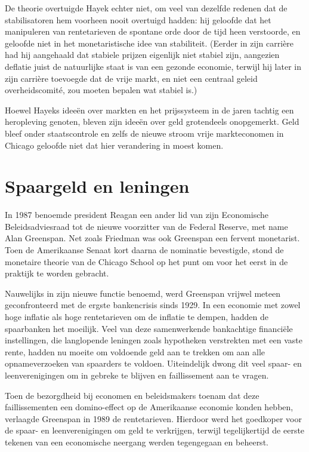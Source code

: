 \documentclass[smalldemyvopaper,11pt,twoside,onecolumn,openright,extrafontsizes,hidelinks]{memoir}
\begin{document}
De theorie overtuigde Hayek echter niet, om veel van dezelfde redenen
dat de stabilisatoren hem voorheen nooit overtuigd hadden: hij geloofde
dat het manipuleren van rentetarieven de spontane orde door de tijd heen
verstoorde, en geloofde niet in het monetaristische idee van
stabiliteit. (Eerder in zijn carrière had hij aangehaald dat stabiele
prijzen eigenlijk niet stabiel zijn, aangezien deflatie juist de
natuurlijke staat is van een gezonde economie, terwijl hij later in zijn
carrière toevoegde dat de vrije markt, en niet een centraal geleid
overheidscomité, zou moeten bepalen wat stabiel is.)

Hoewel Hayeks ideeën over markten en het prijssysteem in de jaren
tachtig een heropleving genoten, bleven zijn ideeën over geld
grotendeels onopgemerkt. Geld bleef onder staatscontrole en zelfs de
nieuwe stroom vrije markteconomen in Chicago geloofde niet dat hier
verandering in moest komen.

\section{Spaargeld en leningen}\label{spaargeld-en-leningen}

In 1987 benoemde president Reagan een ander lid van zijn Economische
Beleidsadviesraad tot de nieuwe voorzitter van de Federal Reserve, met
name Alan Greenspan. Net zoals Friedman was ook Greenspan een fervent
monetarist. Toen de Amerikaanse Senaat kort daarna de nominatie
bevestigde, stond de monetaire theorie van de Chicago School op het punt
om voor het eerst in de praktijk te worden gebracht.

Nauwelijks in zijn nieuwe functie benoemd, werd Greenspan vrijwel meteen
geconfronteerd met de ergste bankencrisis sinds 1929. In een economie
met zowel hoge inflatie als hoge rentetarieven om de inflatie te dempen,
hadden de spaarbanken het moeilijk. Veel van deze samenwerkende
bankachtige financiële instellingen, die langlopende leningen zoals
hypotheken verstrekten met een vaste rente, hadden nu moeite om
voldoende geld aan te trekken om aan alle opnameverzoeken van spaarders
te voldoen. Uiteindelijk dwong dit veel spaar- en leenverenigingen om in
gebreke te blijven en faillissement aan te vragen.

Toen de bezorgdheid bij economen en beleidsmakers toenam dat deze
faillissementen een domino-effect op de Amerikaanse economie konden
hebben, verlaagde Greenspan in 1989 de rentetarieven. Hierdoor werd het
goedkoper voor de spaar- en leenverenigingen om geld te verkrijgen,
terwijl tegelijkertijd de eerste tekenen van een economische neergang
werden tegengegaan en beheerst.
\end{document}
